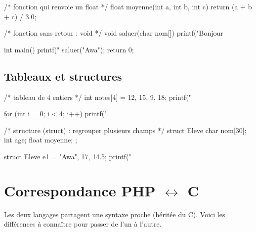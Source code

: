 \begin{syntaxe}
\end{syntaxe}

\begin{codec}
/* fonction qui renvoie un float */
float moyenne(int a, int b, int c) {
    return (a + b + c) / 3.0;
}

/* fonction sans retour : void */
void saluer(char nom[]) {
    printf("Bonjour %
}

int main() {
    printf("%
    saluer("Awa");
    return 0;
}
\end{codec}

\subsection{Tableaux et structures}

\begin{codec}
/* tableau de 4 entiers */
int notes[4] = {12, 15, 9, 18};
printf("%

for (int i = 0; i < 4; i++)
    printf("%

/* structure (struct) : regrouper plusieurs champs */
struct Eleve {
    char nom[30];
    int  age;
    float moyenne;
};

struct Eleve e1 = {"Awa", 17, 14.5};
printf("%
\end{codec}

\section{Correspondance PHP \texorpdfstring{$\leftrightarrow$}{<->} C}

Les deux langages partagent une syntaxe proche (héritée du C). Voici les
différences à connaître pour passer de l'un à l'autre.

